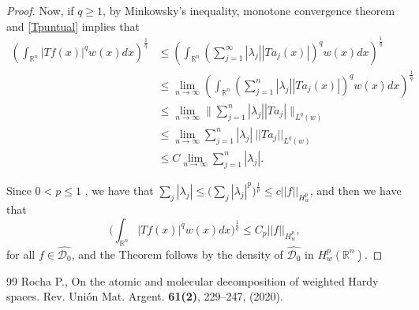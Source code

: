 \documentclass[10pt,a4paper]{amsart}
\begin{document}
\begin{proof}
		Now, if $q\geq 1$, by Minkowsky's inequality, monotone convergence theorem and \eqref{Tpuntual} implies that 
		$$
		\begin{aligned}
			\left(\int_{\mathbb{R}^{n}} |Tf(x)|^{q} w(x) dx\right)^{\frac{1}{q}} &\leq \left(\int_{\mathbb{R}^{n}} \left(\sum_{j=1}^{\infty} |\lambda_j| |Ta_j(x)|\right)^{q} w(x) dx\right)^{\frac{1}{q}}\\
			&\leq  \lim_{n \to \infty} \left(\int_{\mathbb{R}^{n}} \left(\sum_{j=1}^{n} |\lambda_j| |Ta_j(x)|\right)^{q} w(x) dx\right)^{\frac{1}{q}}\\
			&\leq  \lim_{n \to \infty} \Big\| \sum_{j=1}^{n} |\lambda_j| |Ta_j| \Big\|_{L^{q}(w)}\\
			&\leq \lim_{n \to \infty} \sum_{j=1}^{n}|\lambda_j| \ || Ta_j||_{L^{q}(w)}\\
			&\leq C \lim_{n \to \infty} \sum_{j=1}^{n}|\lambda_j|.
		\end{aligned}
		$$
		
		Since $0<p\leq 1$ , we have that $\sum_j |\lambda_j| \leq \Big( \sum_j|\lambda_j|^{p}\Big)^{\frac{1}{p}} \leq c ||f||_{H^{p}_w}$, and then  we have that 
		$$ \Big(\int_{\mathbb{R}^{n}} |Tf(x)|^{q} w(x) dx \Big)^{\frac{1}{q}} \leq C_p ||f||_{H^{p}_w},$$
		for all $f \in \hat{\mathcal{D}_0}$, and the Theorem follows by the density of $\hat{\mathcal{D}_0}$ in $H^{p}_w(\mathbb{R}^{n})$.
	\end{proof}

\begin{thebibliography}{99}
 Rocha P., On the atomic and molecular decomposition of weighted Hardy spaces. Rev. Uni\'on Mat. Argent. \textbf{61(2)}, 229--247, (2020).
\end{thebibliography}
\end{document}
